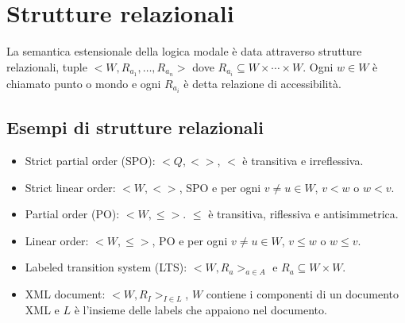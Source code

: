 \section{Strutture relazionali}
La semantica estensionale della logica modale \`e data attraverso strutture relazionali, tuple $<W,R_{a_1},\dots,R_{a_n}>$ dove $R_{a_i}\subseteq W\times\cdots\times W$. Ogni $w\in W$ \`e chiamato 
punto o mondo e ogni $R_{a_i}$ \`e detta relazione di accessibilit\`a.
\subsection{Esempi di strutture relazionali}
\begin{itemize}
\item Strict partial order (SPO): $<Q, < >$, $<$ \`e transitiva e irreflessiva.
\item Strict linear order: $<W, < >$, SPO e per ogni $v\neq u\in W$, $v<w$ o $w<v$.
\item Partial order (PO): $<W,\le >$. $\le$ \`e transitiva, riflessiva e antisimmetrica.
\item Linear order: $<W, \le>$, PO e per ogni $v\neq u\in W$, $v\le w$ o $w\le v$.
\item Labeled transition system (LTS): $<W, R_a>_{a\in A}$ e $R_a\subseteq W\times W$.
\item XML document: $<W, R_I>_{I\in L}$, $W$ contiene i componenti di un documento XML e $L$ \`e l'insieme delle labels che appaiono nel documento.
\end{itemize}
